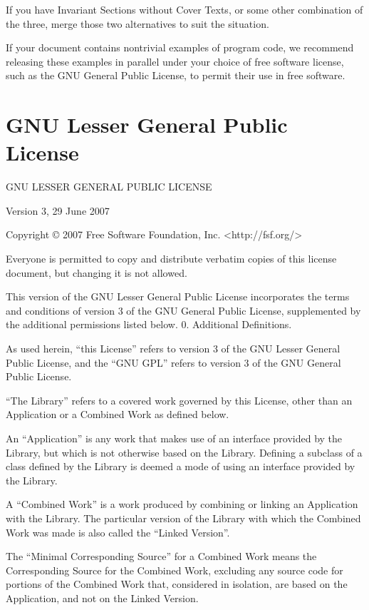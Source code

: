 {\begin{multicols}{4}
If you have Invariant Sections without Cover Texts, or some other combination of the three, merge those two alternatives to suit the situation.

If your document contains nontrivial examples of program code, we recommend releasing these examples in parallel under your choice of free software license, such as the GNU General Public License, to permit their use in free software.
\end{multicols}

\section{GNU Lesser General Public License}
\begin{multicols}{4}


GNU LESSER GENERAL PUBLIC LICENSE

Version 3, 29 June 2007

Copyright © 2007 Free Software Foundation, Inc. <http://fsf.org/>

Everyone is permitted to copy and distribute verbatim copies of this license document, but changing it is not allowed.

This version of the GNU Lesser General Public License incorporates the terms and conditions of version 3 of the GNU General Public License, supplemented by the additional permissions listed below.
0. Additional Definitions.

As used herein, “this License” refers to version 3 of the GNU Lesser General Public License, and the “GNU GPL” refers to version 3 of the GNU General Public License.

“The Library” refers to a covered work governed by this License, other than an Application or a Combined Work as defined below.

An “Application” is any work that makes use of an interface provided by the Library, but which is not otherwise based on the Library. Defining a subclass of a class defined by the Library is deemed a mode of using an interface provided by the Library.

A “Combined Work” is a work produced by combining or linking an Application with the Library. The particular version of the Library with which the Combined Work was made is also called the “Linked Version”.

The “Minimal Corresponding Source” for a Combined Work means the Corresponding Source for the Combined Work, excluding any source code for portions of the Combined Work that, considered in isolation, are based on the Application, and not on the Linked Version.


\end{multicols}}

